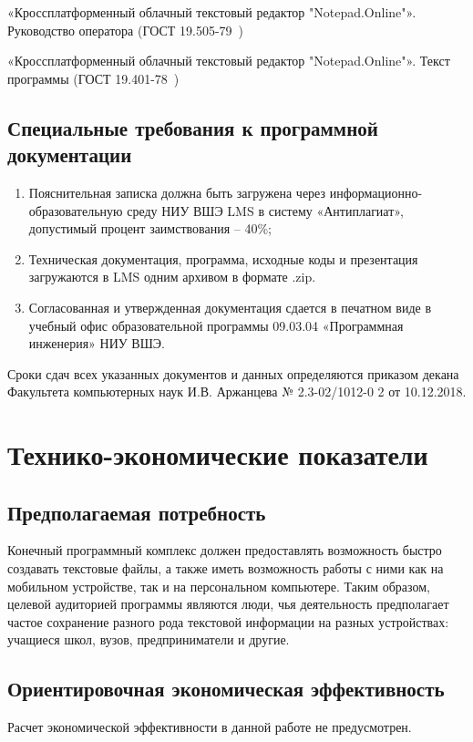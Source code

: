«Кроссплатформенный облачный текстовый редактор "Notepad.Online"». Руководство оператора (ГОСТ 19.505-79~\cite{espd505})

«Кроссплатформенный облачный текстовый редактор "Notepad.Online"». Текст программы (ГОСТ 19.401-78~\cite{espd401})

\subsection{Специальные требования к программной документации}
\begin{enumerate}
\item Пояснительная записка должна быть загружена через информационно-образовательную среду НИУ ВШЭ LMS в систему «Антиплагиат», допустимый процент заимствования – 40\%;
\item Техническая документация, программа, исходные коды и презентация загружаются в LMS одним архивом в формате .zip.
\item Согласованная и утвержденная документация сдается в печатном виде в учебный офис образовательной программы 09.03.04 «Программная инженерия» НИУ ВШЭ.
\end{enumerate}

Сроки сдач всех указанных документов и данных определяются приказом декана Факультета компьютерных наук И.В. Аржанцева № 2.3-02/1012-0 2 от 10.12.2018. 

\section{Технико-экономические показатели}

\subsection{Предполагаемая потребность}
Конечный программный комплекс должен предоставлять возможность быстро создавать текстовые файлы, а также иметь возможность работы с ними как на мобильном устройстве, так и на персональном компьютере. Таким образом, целевой аудиторией программы являются люди, чья деятельность предполагает частое сохранение разного рода текстовой информации на разных устройствах: учащиеся школ, вузов, предприниматели и другие.

\subsection{Ориентировочная экономическая эффективность}
Расчет экономической эффективности в данной работе не предусмотрен.

